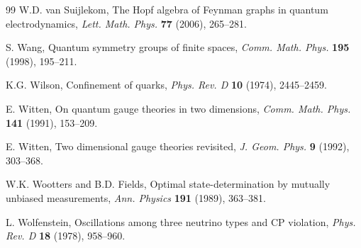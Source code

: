 \documentclass[11pt]{amsart}
\theoremstyle{definition}
\begin{document}
\begin{thebibliography}{99}
 W.D. van Suijlekom, The Hopf algebra of Feynman graphs in quantum electrodynamics, {\em Lett. Math. Phys.} {\bf 77} (2006), 265--281.

 S. Wang, Quantum symmetry groups of finite spaces, {\em Comm. Math. Phys.} {\bf 195} (1998), 195--211.

 K.G. Wilson, Confinement of quarks, {\em Phys. Rev. D} {\bf 10} (1974), 2445--2459.

 E. Witten, On quantum gauge theories in two dimensions, {\em Comm. Math. Phys.} {\bf 141} (1991), 153--209.

 E. Witten, Two dimensional gauge theories revisited, {\em J. Geom. Phys.} {\bf 9} (1992), 303--368.

 W.K. Wootters and B.D. Fields, Optimal state-determination by mutually unbiased measurements, {\em Ann. Physics} {\bf 191} (1989), 363--381.

 L. Wolfenstein, Oscillations among three neutrino types and CP violation, {\em Phys. Rev. D} {\bf 18} (1978), 958--960.

\end{thebibliography}
\end{document}
